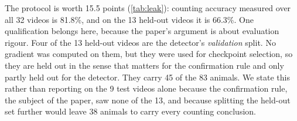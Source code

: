 The protocol is worth 15.5 points (\cref{tab:leak}): counting accuracy measured over all 32
videos is 81.8\%, and on the 13 held-out videos it is 66.3\%. One qualification belongs
here, because the paper's argument is about evaluation rigour. Four of the 13 held-out
videos are the detector's \emph{validation} split. No gradient was computed on them, but
they were used for checkpoint selection, so they are held out in the sense that matters for
the confirmation rule and only partly held out for the detector. They carry 45 of the 83
animals. We state this rather than reporting on the 9 test videos alone because the
confirmation rule, the subject of the paper, saw none of the 13, and because splitting
the held-out set further would leave 38 animals to carry every counting conclusion.
